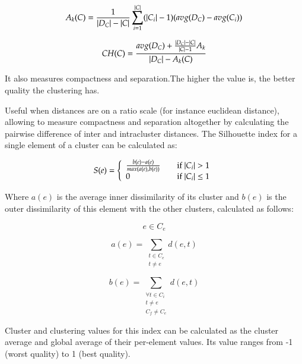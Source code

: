 \begin{equation} 
A_k(C) = \frac{1}{|D_C|-\lvert C\rvert}  \sum_{i=1}^{\lvert C\rvert} (|C_i|-1)(avg(D_C)-avg(C_i)) 
\end{equation}

\begin{equation} 
CH(C)=\frac{avg(D_C)+\frac{|D_C|-\lvert C\rvert}{\lvert C\rvert -1}A_k}{|D_C|-A_k(C)} 
\end{equation}

It also measures compactness and separation.The higher the value is,
the better quality the clustering has.



Useful when distances are on a ratio scale (for instance euclidean
distance), allowing to measure compactness and separation altogether
by calculating the pairwise difference of inter and intracluster distances.
The Silhouette index for a single element of a cluster can be calculated
as:

\begin{equation} 
S(e) = \left\{ \begin{array}{l l} \frac{b(e)-a(e)}{max(a(e),b(e))} & \quad \text{if $|C_i|>1$} \\
    0 & \quad \text{if $|C_i| \leq 1$} \end{array} \right.
\end{equation}

Where $a(e)$ is the average inner dissimilarity of its cluster and
$b(e)$ is the outer dissimilarity of this element with the other
clusters, calculated as follows:

\begin{equation} 
e \in C_e
\end{equation}

\begin{equation} 
a(e)=\sum_{\substack{t\in C_e\\t \neq e}}d(e,t)
\end{equation}

\begin{equation} 
b(e)=\sum_{\substack{\forall t\in C_i\\t \neq e \\ C_f \neq C_e}}d(e,t)
\end{equation}

Cluster and clustering values for this index can be calculated as
the cluster average and global average of their per-element values.
Its value ranges from -1 (worst quality) to 1 (best quality).


